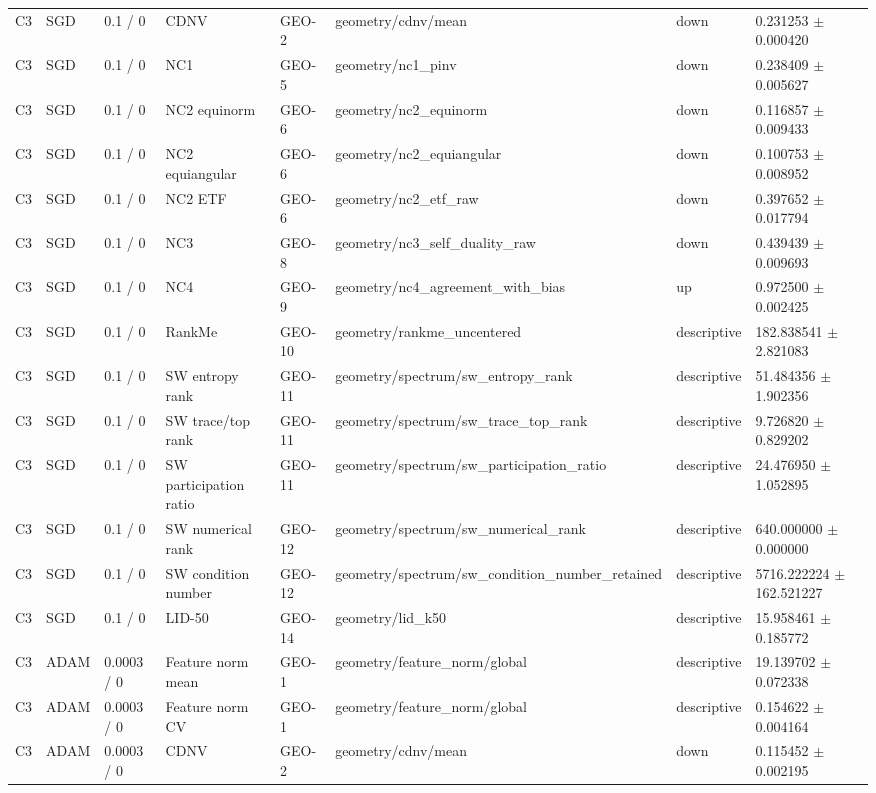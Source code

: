 \begin{longtable}{llllllll}
C3 & SGD & 0.1 / 0 & CDNV & GEO-2 & geometry/cdnv/mean & down & 0.231253 $\pm$ 0.000420 \\
C3 & SGD & 0.1 / 0 & NC1 & GEO-5 & geometry/nc1\_pinv & down & 0.238409 $\pm$ 0.005627 \\
C3 & SGD & 0.1 / 0 & NC2 equinorm & GEO-6 & geometry/nc2\_equinorm & down & 0.116857 $\pm$ 0.009433 \\
C3 & SGD & 0.1 / 0 & NC2 equiangular & GEO-6 & geometry/nc2\_equiangular & down & 0.100753 $\pm$ 0.008952 \\
C3 & SGD & 0.1 / 0 & NC2 ETF & GEO-6 & geometry/nc2\_etf\_raw & down & 0.397652 $\pm$ 0.017794 \\
C3 & SGD & 0.1 / 0 & NC3 & GEO-8 & geometry/nc3\_self\_duality\_raw & down & 0.439439 $\pm$ 0.009693 \\
C3 & SGD & 0.1 / 0 & NC4 & GEO-9 & geometry/nc4\_agreement\_with\_bias & up & 0.972500 $\pm$ 0.002425 \\
C3 & SGD & 0.1 / 0 & RankMe & GEO-10 & geometry/rankme\_uncentered & descriptive & 182.838541 $\pm$ 2.821083 \\
C3 & SGD & 0.1 / 0 & SW entropy rank & GEO-11 & geometry/spectrum/sw\_entropy\_rank & descriptive & 51.484356 $\pm$ 1.902356 \\
C3 & SGD & 0.1 / 0 & SW trace/top rank & GEO-11 & geometry/spectrum/sw\_trace\_top\_rank & descriptive & 9.726820 $\pm$ 0.829202 \\
C3 & SGD & 0.1 / 0 & SW participation ratio & GEO-11 & geometry/spectrum/sw\_participation\_ratio & descriptive & 24.476950 $\pm$ 1.052895 \\
C3 & SGD & 0.1 / 0 & SW numerical rank & GEO-12 & geometry/spectrum/sw\_numerical\_rank & descriptive & 640.000000 $\pm$ 0.000000 \\
C3 & SGD & 0.1 / 0 & SW condition number & GEO-12 & geometry/spectrum/sw\_condition\_number\_retained & descriptive & 5716.222224 $\pm$ 162.521227 \\
C3 & SGD & 0.1 / 0 & LID-50 & GEO-14 & geometry/lid\_k50 & descriptive & 15.958461 $\pm$ 0.185772 \\
C3 & ADAM & 0.0003 / 0 & Feature norm mean & GEO-1 & geometry/feature\_norm/global & descriptive & 19.139702 $\pm$ 0.072338 \\
C3 & ADAM & 0.0003 / 0 & Feature norm CV & GEO-1 & geometry/feature\_norm/global & descriptive & 0.154622 $\pm$ 0.004164 \\
C3 & ADAM & 0.0003 / 0 & CDNV & GEO-2 & geometry/cdnv/mean & down & 0.115452 $\pm$ 0.002195 \\

\end{longtable}
